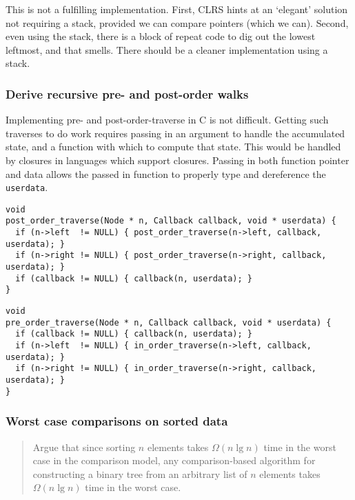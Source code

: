 \documentclass{article}
\begin{document}
This is not a fulfilling implementation. First, CLRS hints at an
`elegant' solution not requiring a stack, provided we can compare pointers
(which we can). Second, even using the stack, there is a block of
repeat code to dig out the lowest leftmost, and that smells. There should
be a cleaner implementation using a stack.


\subsubsection{Derive recursive pre- and post-order walks}

Implementing pre- and post-order-traverse in C is not difficult. Getting
such traverses to do work requires passing in an argument to handle
the accumulated state, and a function with which to compute that state.
This would be handled by closures in languages which support closures.
Passing in both function pointer and data allows the passed in function
to properly type and dereference the \texttt{userdata}.

\begin{lstlisting}[frame=single,title=Post-order traverse]
void
post_order_traverse(Node * n, Callback callback, void * userdata) {
  if (n->left  != NULL) { post_order_traverse(n->left, callback, userdata); }
  if (n->right != NULL) { post_order_traverse(n->right, callback, userdata); }
  if (callback != NULL) { callback(n, userdata); }
}
\end{lstlisting}

\begin{lstlisting}[frame=single,title=Pre-order traverse]
void
pre_order_traverse(Node * n, Callback callback, void * userdata) {
  if (callback != NULL) { callback(n, userdata); }
  if (n->left  != NULL) { in_order_traverse(n->left, callback, userdata); }
  if (n->right != NULL) { in_order_traverse(n->right, callback, userdata); }
}
\end{lstlisting}


\subsubsection{Worst case comparisons on sorted data}

\begin{quote}
  Argue that since sorting $n$ elements takes $\Omega(n\lg n)$ time in the worst
  case in the comparison model, any comparison-based algorithm for
  constructing a binary tree from an arbitrary list of $n$ elements takes
  $\Omega(n\lg n)$ time in the worst case.
\end{quote}
\end{document}
